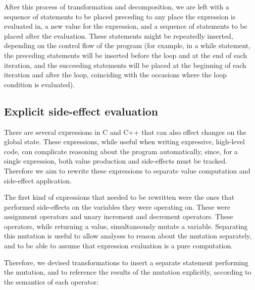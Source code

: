 After this process of transformation and decomposition, we are left with a sequence of statements to be placed preceding to any place the expression is evaluated in, a new value for the expression, and a sequence of statements to be placed after the evaluation\footnotemark. These statements might be repeatedly inserted, depending on the control flow of the program (for example, in a while statement, the preceding statements will be inserted before the loop and at the end of each iteration, and the succeeding statements will be placed at the beginning of each iteration and after the loop, coinciding with the occasions where the loop condition is evaluated). 

\subsection{Explicit side-effect evaluation}

There are several expressions in C and C++ that can also effect changes on the global state. These expressions, while useful when writing expressive, high-level code, can complicate reasoning about the program automatically, since, for a single expression, both value production and side-effects must be tracked. Therefore we aim to rewrite these expressions to separate value computation and side-effect application.

The first kind of expressions that needed to be rewritten were the ones that performed side-effects on the variables they were operating on. These were assignment operators and unary increment and decrement operators. These operators, while returning a value, simultaneously mutate a variable. Separating this mutation is useful to allow analyses to reason about the mutation separately, and to be able to assume that expression evaluation is a pure computation.

Therefore, we devised transformations to insert a separate statement performing the mutation, and to reference the results of the mutation explicitly, according to the semantics of each operator:


